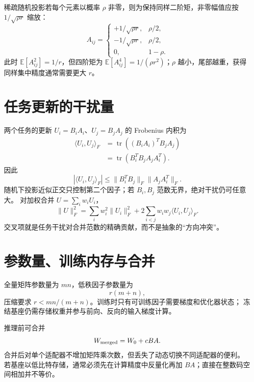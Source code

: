 \documentclass[11pt]{article}
\numberwithin{equation}{section}
\newcommand{\E}{\mathbb{E}}
\newcommand{\1}{\mathbf{1}}
\newcommand{\tr}{\operatorname{tr}}
\begin{document}
稀疏随机投影若每个元素以概率 $\rho$ 非零，则为保持同样二阶矩，非零幅值应按
$1/\sqrt{\rho r}$ 缩放：
\begin{equation}
 A_{ij}=\begin{cases}
 +1/\sqrt{\rho r},&\rho/2,\\
 -1/\sqrt{\rho r},&\rho/2,\\
 0,&1-\rho.
 \end{cases}
\end{equation}
此时 $\E[A_{ij}^2]=1/r$，但四阶矩为
$\E[A_{ij}^4]=1/(\rho r^2)$；$\rho$ 越小，尾部越重，获得同样集中精度通常需要更大 $r$。

\section{任务更新的干扰量}

两个任务的更新 $U_i=B_iA_i$、$U_j=B_jA_j$ 的 Frobenius 内积为
\begin{align}
 \langle U_i,U_j\rangle_F
 &=\tr((B_iA_i)^TB_jA_j)\\
 &=\tr(B_i^TB_jA_jA_i^T).
\end{align}
因此
\begin{equation}
 |\langle U_i,U_j\rangle_F|
 \le\|B_i^TB_j\|_F\|A_jA_i^T\|_F.
\end{equation}
随机下投影近似正交只控制第二个因子；若 $B_i,B_j$ 范数无界，绝对干扰仍可任意大。
对加权合并 $U=\sum_iw_iU_i$，
\begin{equation}
 \|U\|_F^2
 =\sum_iw_i^2\|U_i\|_F^2
 +2\sum_{i<j}w_iw_j\langle U_i,U_j\rangle_F.
\end{equation}
交叉项就是任务干扰对合并范数的精确贡献，而不是抽象的“方向冲突”。

\section{参数量、训练内存与合并}

全量矩阵参数量为 $mn$，低秩因子参数量为
\begin{equation}
 r(m+n),
\end{equation}
压缩要求 $r<mn/(m+n)$。训练时只有可训练因子需要梯度和优化器状态；
冻结基座仍需存储权重并参与前向、反向的输入梯度计算。

推理前可合并
\begin{equation}
 W_{\rm merged}=W_0+cBA.
\end{equation}
合并后对单个适配器不增加矩阵乘次数，但丢失了动态切换不同适配器的便利。
若基座以低比特存储，通常必须先在计算精度中反量化再加 $BA$；直接在整数码空间相加并不等价。
\end{document}
